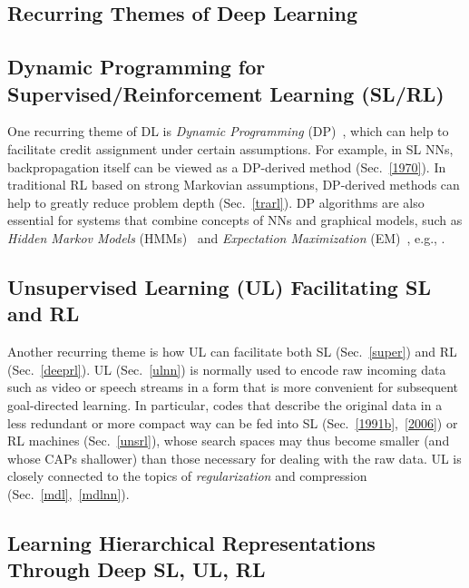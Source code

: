 \documentclass[letterpaper]{article}
\begin{document}
\begin{CJK*}{UTF8}{gbsn}


\section{Recurring Themes of Deep Learning}
\label{themes}

\subsection{Dynamic Programming for Supervised/Reinforcement Learning (SL/RL)}
\label{dp}

One recurring theme of DL is
{\em Dynamic Programming} (DP)~\citep{Bellman:1957},
which  can help to facilitate credit assignment
under certain assumptions. For example, 
in SL NNs, backpropagation itself can be viewed as a DP-derived method (Sec.~\ref{1970}).
In traditional RL based on strong Markovian assumptions,
DP-derived methods can help to greatly reduce problem depth (Sec.~\ref{trarl}). 
DP algorithms are also essential for systems that combine concepts of NNs and
graphical models, such as {\em Hidden Markov
Models} (HMMs)~\citep{stratonovich1960,baum1966}
and {\em Expectation Maximization} (EM)~\citep{dempster77,friedman2001}, e.g., \citep{bottou91,bengio91,bourlard+morgan:1994,baldichauvin96,jordan2001,bishop:2006,hastie2009,domingos2011,dahl2012,speech2012,diwu2014}.



\subsection{Unsupervised Learning (UL) Facilitating SL and RL}
\label{ul}

Another recurring theme is how 
UL 
can facilitate both SL (Sec.~\ref{super}) and RL (Sec.~\ref{deeprl}).
UL (Sec.~\ref{ulnn}) is normally used to 
encode raw incoming data such as video or speech streams
in a form that is more convenient for subsequent goal-directed learning.
In particular, codes that describe the original data in a less redundant or more compact way
can be fed into SL (Sec.~\ref{1991b},~\ref{2006})
or RL machines (Sec.~\ref{unsrl}), whose
search spaces may thus become smaller 
(and whose CAPs shallower)
than those necessary for dealing with the raw data.
UL is closely 
connected to the topics of 
{\em regularization} 
and compression (Sec.~\ref{mdl},~\ref{mdlnn}).

\subsection{Learning Hierarchical Representations Through Deep SL, UL, RL}
\label{hie}


\end{CJK*}
\end{document}
